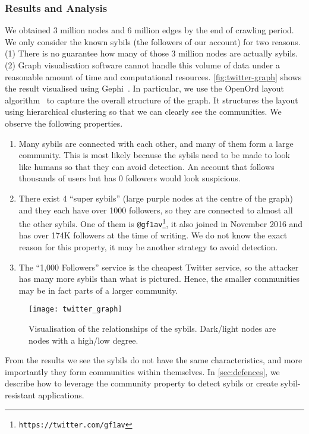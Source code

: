 \subsubsection{Results and Analysis}
We obtained 3 million nodes and 6 million edges by the end of crawling period.
We only consider the known sybils (the followers of our account) for two reasons.
(1) There is no guarantee how many of those 3 million nodes are actually sybils.
(2) Graph visualisation software cannot handle this volume of data under a
reasonable amount of time and computational resources.
\autoref{fig:twitter-graph} shows the result visualised using
Gephi~\cite{bastian2009gephi}. In particular, we use the OpenOrd layout
algorithm~\cite{martin2011openord} to capture the overall structure of the
graph. It structures the layout using hierarchical clustering so that we can
clearly see the communities. We observe the following properties.
\begin{enumerate}
  \item Many sybils are connected with each other, and many of them form a large
    community. This is most likely because the sybils need to be made to look like
    humans so that they can avoid detection. An account that follows thousands of
    users but has 0 followers would look suspicious.
  \item There exist 4 ``super sybils'' (large purple nodes at the centre of the
    graph) and they each have over 1000 followers, so they are connected to
    almost all the other sybils. One of them is
    \verb!@gf1av!\footnote{\texttt{https://twitter.com/gf1av}}, it also joined
    in November 2016 and has over 174K followers at the time of writing. We do
    not know the exact reason for this property, it may be another strategy to
    avoid detection.
  \item The ``1,000 Followers'' service is the cheapest Twitter service, so the
    attacker has many more sybils than what is pictured. Hence, the smaller
    communities may be in fact parts of a larger community.
\end{enumerate}

\begin{figure}
  \centering
  \texttt{[image: twitter\_graph]}
  \caption{Visualisation of the relationships of the sybils. Dark/light nodes
    are nodes with a high/low degree.}
  \label{fig:twitter-graph}
\end{figure}

From the results we see the sybils do not have the same characteristics, and
more importantly they form communities within themselves. In
\autoref{sec:defences}, we describe how to leverage the community property to
detect sybils or create sybil-resistant applications.

